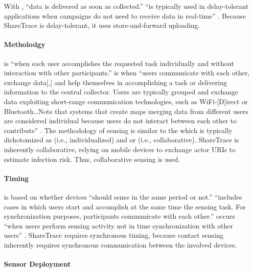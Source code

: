 With , ``data is delivered as soon as collected.''  ``is typically used in delay-tolerant applications when campaigns do not need to receive data in real-time'' \citep{Capponi2019}. Because ShareTrace is delay-tolerant, it uses store-and-forward uploading.

\paragraph{Metholodgy}

 is ``when each user accomplishes the requested task individually and without interaction with other participants.''  is when ``users communicate with each other, exchange data[,] and help themselves in accomplishing a task or delivering information to the central collector. Users are typically grouped and exchange data exploiting short-range communication technologies, such as WiFi-[D]irect or Bluetooth{\ldots}Note that systems that create maps merging data from different users are considered individual because users do not interact between each other to contribute'' \citep{Capponi2019}. The methodology of sensing is similar to the  which is typically dichotomized as  \citep{Lane2010, Ganti2011} (i.e., individualized) and  \citep{Ganti2011} or  \citep{Lane2010} (i.e., collaborative). ShareTrace is inherently collaborative, relying on mobile devices to exchange actor URIs to estimate infection risk. Thus, collaborative sensing is used.

\paragraph{Timing}

 is based on whether devices ``should sense in the same period or not.''  ``includes cases in which users start and accomplish at the same time the sensing task. For synchronization purposes, participants communicate with each other.''  occurs ``when users perform sensing activity not in time synchronization with other users'' \citep{Capponi2019}. ShareTrace requires synchronous timing, because contact sensing inherently requires synchronous communication between the involved devices.

\paragraph{Sensor Deployment}

